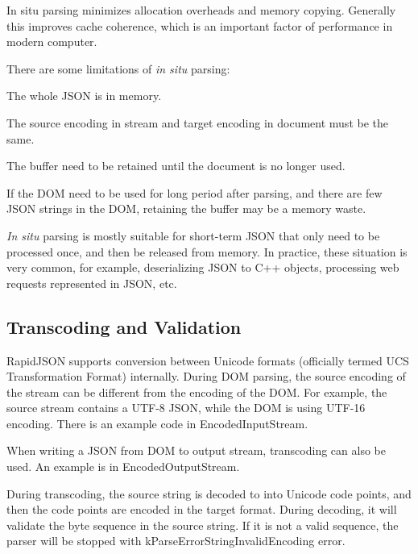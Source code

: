 In situ parsing minimizes allocation overheads and memory copying. Generally this improves cache coherence, which is an important factor of performance in modern computer.

There are some limitations of {\itshape in situ} parsing\+:


\begin{DoxyEnumerate}
\item The whole J\+S\+ON is in memory.
\item The source encoding in stream and target encoding in document must be the same.
\item The buffer need to be retained until the document is no longer used.
\item If the D\+OM need to be used for long period after parsing, and there are few J\+S\+ON strings in the D\+OM, retaining the buffer may be a memory waste.
\end{DoxyEnumerate}

{\itshape In situ} parsing is mostly suitable for short-\/term J\+S\+ON that only need to be processed once, and then be released from memory. In practice, these situation is very common, for example, deserializing J\+S\+ON to C++ objects, processing web requests represented in J\+S\+ON, etc.\hypertarget{md_Cadriciel_Commun_Externe_RapidJSON_doc_dom.zh-cn_TranscodingAndValidation}{}\subsection{Transcoding and Validation}\label{md_Cadriciel_Commun_Externe_RapidJSON_doc_dom.zh-cn_TranscodingAndValidation}
Rapid\+J\+S\+ON supports conversion between Unicode formats (officially termed U\+CS Transformation Format) internally. During D\+OM parsing, the source encoding of the stream can be different from the encoding of the D\+OM. For example, the source stream contains a U\+T\+F-\/8 J\+S\+ON, while the D\+OM is using U\+T\+F-\/16 encoding. There is an example code in Encoded\+Input\+Stream.

When writing a J\+S\+ON from D\+OM to output stream, transcoding can also be used. An example is in Encoded\+Output\+Stream.

During transcoding, the source string is decoded to into Unicode code points, and then the code points are encoded in the target format. During decoding, it will validate the byte sequence in the source string. If it is not a valid sequence, the parser will be stopped with {\ttfamily k\+Parse\+Error\+String\+Invalid\+Encoding} error.

